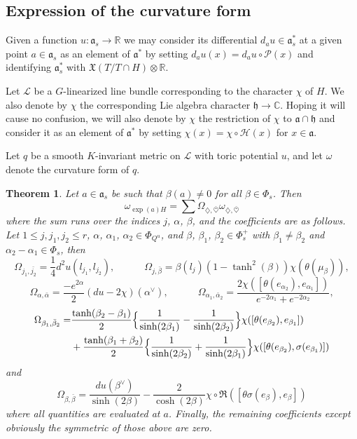 \documentclass{amsart}
\newtheorem{thm}{Theorem}[section]
\theoremstyle{definition}
\begin{document}
\subsection{Expression of the curvature form}

Given a function $u:\mathfrak{a}_s \rightarrow \mathbb{R}$ we may consider 
its differential $d_au \in \mathfrak{a}_s^*$ at a given point $a\in \mathfrak{a}_s$ 
as an element of $\mathfrak{a}^*$ by setting $d_au(x)=d_au\circ\mathcal{P}(x)$ and 
identifying $\mathfrak{a}^*_s$ with $\mathfrak{X}(T/T\cap H)\otimes \mathbb{R}$. 

Let $\mathcal{L}$ be a $G$-linearized line bundle corresponding to 
the character $\chi$ of $H$. We also denote by $\chi$ the corresponding 
Lie algebra character $\mathfrak{h}\rightarrow \mathbb{C}$. Hoping it 
will cause no confusion, we will also denote by $\chi$ the restriction 
of $\chi$ to $\mathfrak{a}\cap \mathfrak{h}$ and consider it as an element
of $\mathfrak{a}^*$ by setting $\chi(x)=\chi\circ\mathcal{H}(x)$ for 
$x\in \mathfrak{a}$.

Let $q$ be a smooth $K$-invariant metric on $\mathcal{L}$ with toric potential $u$, 
and let $\omega$ denote the curvature form of $q$. 

\begin{thm}
\label{thm_curv}
Let $a\in \mathfrak{a}_s$ be such that $\beta(a)\neq 0$ for all 
$\beta \in \Phi_s$. Then 
\[
\omega_{\exp(a)H} = \sum \Omega_{\diamondsuit,\bar{\heartsuit}} \omega_{\diamondsuit,\bar{\heartsuit}}
\]
where the sum runs over the indices $j$, $\alpha$, $\beta$, and 
the coefficients are as follows.
Let $1\leq j,j_1,j_2\leq r$, $\alpha$, $\alpha_1$, $\alpha_2\in \Phi_{Q^u}$, and 
$\beta$, $\beta_1$, $\beta_2\in \Phi_s^+$ with $\beta_1\neq \beta_2$ and $\alpha_2-\alpha_1\in \Phi_s$, then 
\[
\Omega_{j_1,\bar{j_2}} =\frac{1}{4}d^2u(l_{j_1},l_{j_2}), \quad \qquad 
\Omega_{j,\bar{\beta}} = \beta(l_j)(1-\tanh^2(\beta))\chi(\theta(\mu_{\beta})),
\]
\[
\Omega_{\alpha,\bar{\alpha}} = 
\frac{-e^{2\alpha}}{2}(du-2\chi)(\alpha^{\vee}), \quad \qquad 
\Omega_{\alpha_1,\bar{\alpha}_2} = 
\frac{2\chi([\theta(e_{\alpha_2}),e_{\alpha_1}])}{e^{-2\alpha_1}+e^{-2\alpha_2}},
\]
\begin{align*}
\Omega_{\beta_1,\bar{\beta}_2} = & 
\frac{\tanh(\beta_2-\beta_1)}{2}\Big{\{}\frac{1}{\sinh(2\beta_1)}
-\frac{1}{\sinh(2\beta_2)}\Big{\}} \chi([\theta(e_{\beta_2}),e_{\beta_1}])  
\\
 & +\frac{\tanh(\beta_1+\beta_2)}{2}\Big{\{}\frac{1}{\sinh(2\beta_2)}
+\frac{1}{\sinh(2\beta_1)}\Big{\}} \chi([\theta(e_{\beta_2}),\sigma(e_{\beta_1})]) 
\end{align*}
and 
\[
\Omega_{\beta,\bar{\beta}} =  
\frac{du(\beta^{\vee})}{\sinh(2\beta)} 
-\frac{2}{\cosh(2\beta)}\chi\circ\Re([\theta\sigma(e_{\beta}),e_{\beta}])
\]
where all quantities are evaluated at $a$.
Finally, the remaining coefficients except obviously the symmetric of those above are zero.
\end{thm}
\end{document}
